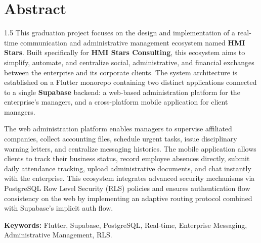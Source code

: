 \chapter*{Abstract}
\begin{spacing}{1.5}
This graduation project focuses on the design and implementation of a real-time communication and administrative management ecosystem named \textbf{HMI Stars}. Built specifically for \textbf{HMI Stars Consulting}, this ecosystem aims to simplify, automate, and centralize social, administrative, and financial exchanges between the enterprise and its corporate clients. The system architecture is established on a Flutter monorepo containing two distinct applications connected to a single \textbf{Supabase} backend: a web-based administration platform for the enterprise's managers, and a cross-platform mobile application for client managers.

The web administration platform enables managers to supervise affiliated companies, collect accounting files, schedule urgent tasks, issue disciplinary warning letters, and centralize messaging histories. The mobile application allows clients to track their business status, record employee absences directly, submit daily attendance tracking, upload administrative documents, and chat instantly with the enterprise. This ecosystem integrates advanced security mechanisms via PostgreSQL Row Level Security (RLS) policies and ensures authentication flow consistency on the web by implementing an adaptive routing protocol combined with Supabase's implicit auth flow.

\textbf{Keywords:} Flutter, Supabase, PostgreSQL, Real-time, Enterprise Messaging, Administrative Management, RLS.
\end{spacing}

